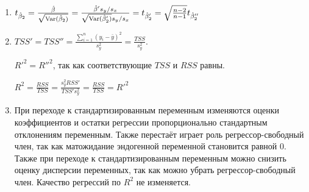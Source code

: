 \begin{problem}
\begin{sol}
\begin{enumerate}
\item $t_{\hat{\beta}_2}=\frac{\hat\beta}{\sqrt{\operatorname{Var}(\hat{\beta}_2)}}=\frac{\hat\beta's_y/s_x}{\sqrt{\operatorname{Var}(\hat{\beta}_2')}s_y/s_x}=t_{\hat{\beta}_2'}=\sqrt{\frac{n-2}{n-1}}t_{\hat{\beta}_2''}$

\item $TSS'=TSS''=\frac{\sum_{i=1}^n(y_i-\bar y)^2}{s_y^2}=\frac{TSS}{s_y^2}$.

$R'^2=R''^2$, так как соответствующие $TSS$ и $RSS$ равны.

$R^2=\frac{RSS}{TSS}=\frac{s_y^2RSS'}{TSS's_y^2}=\frac{RSS}{TSS}=R'^2$

\item При переходе к стандартизированным переменным изменяются оценки коэффициентов и остатки регрессии пропорционально стандартным отклонениям переменным. Также перестаёт играет роль регрессор-свободный член, так как матожидание эндогенной переменной становится равной 0. Также при переходе к стандартизированным переменным можно снизить оценку дисперсии переменных, так как можно убрать регрессор-свободный член. Качество регрессий по $R^2$ не изменяется.

\end{enumerate}
\end{sol}
\end{problem}




